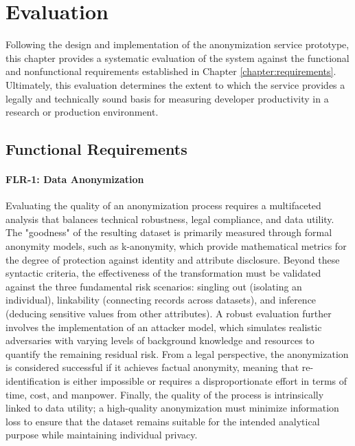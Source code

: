 \chapter{Evaluation}
\label{chapter:evaluation}

Following the design and implementation of the anonymization service prototype, this chapter provides a systematic evaluation of the system against the functional and nonfunctional requirements established in Chapter \ref{chapter:requirements}.  Ultimately, this evaluation determines the extent to which the service provides a legally and technically sound basis for measuring developer productivity in a research or production environment.

\section{Functional Requirements}

\subsubsection{FLR-1: Data Anonymization}

Evaluating the quality of an anonymization process requires a multifaceted analysis that balances technical robustness, legal compliance, and data utility. The "goodness" of the resulting dataset is primarily measured through formal anonymity models, such as k-anonymity, which provide mathematical metrics for the degree of protection against identity and attribute disclosure. Beyond these syntactic criteria, the effectiveness of the transformation must be validated against the three fundamental risk scenarios: singling out (isolating an individual), linkability (connecting records across datasets), and inference (deducing sensitive values from other attributes). A robust evaluation further involves the implementation of an attacker model, which simulates realistic adversaries with varying levels of background knowledge and resources to quantify the remaining residual risk. From a legal perspective, the anonymization is considered successful if it achieves factual anonymity, meaning that re-identification is either impossible or requires a disproportionate effort in terms of time, cost, and manpower. Finally, the quality of the process is intrinsically linked to data utility; a high-quality anonymization must minimize information loss to ensure that the dataset remains suitable for the intended analytical purpose while maintaining individual privacy.
\autocite[73--75,81--82,86--88,103--106,120-121]{Krebs2022}
\autocite[61--63]{gmdsbvd2024praxishilfe}
\autocite[3--6,28--29]{schwartmann2022praxisleitfaden}

